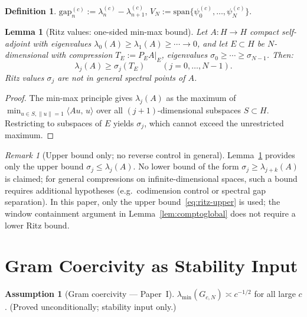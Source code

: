 \documentclass[12pt,a4paper]{amsart}
\newtheorem{lemma}[theorem]{Lemma}
\theoremstyle{definition}
\newtheorem{definition}[theorem]{Definition}
\newtheorem{assumption}[theorem]{Assumption}
\theoremstyle{remark}
\newtheorem{remark}[theorem]{Remark}
\newcommand{\ip}[2]{\langle #1,\, #2\rangle}
\newcommand{\lam}[2]{\lambda_{#2}^{(#1)}}
\newcommand{\gap}[2]{\mathrm{gap}_{#2}^{(#1)}}
\newcommand{\pswf}[1]{\psi_{#1}^{(c)}}
\newcommand{\spann}{\mathrm{span}}
\begin{document}
\begin{definition}
$\gap{c}{n} := \lam{c}{n} - \lam{c}{n+1}$,\quad
$V_N := \spann\{\pswf{0},\ldots,\pswf{N}\}$.
\end{definition}

\begin{lemma}[Ritz values: one-sided min-max bound]
\label{lem:compression}
Let $A: H \to H$ compact self-adjoint with eigenvalues
$\lambda_0(A) \geq \lambda_1(A) \geq \cdots \to 0$,
and let $E \subset H$ be $N$-dimensional with compression
$T_E := P_E A|_E$, eigenvalues $\sigma_0 \geq \cdots \geq \sigma_{N-1}$.
Then:
\begin{equation}\label{eq:ritz-upper}
  \lambda_j(A) \geq \sigma_j(T_E) \qquad (j = 0,\ldots,N-1).
\end{equation}
Ritz values $\sigma_j$ are not in general spectral points of $A$.
\end{lemma}

\begin{proof}
The min-max principle gives $\lambda_j(A)$ as the maximum of
$\min_{u \in S,\|u\|=1}\ip{Au}{u}$ over all $(j{+}1)$-dimensional
subspaces $S \subset H$. Restricting to subspaces of $E$ yields
$\sigma_j$, which cannot exceed the unrestricted maximum.
\end{proof}

\begin{remark}[Upper bound only; no reverse control in general]
\label{rem:upper-only}
Lemma~\ref{lem:compression} provides only the upper bound
$\sigma_j \leq \lambda_j(A)$.
No lower bound of the form $\sigma_j \geq \lambda_{j+k}(A)$ is claimed;
for general compressions on infinite-dimensional spaces, such a bound
requires additional hypotheses (e.g.\ codimension control or
spectral gap separation).
In this paper, only the upper bound~\eqref{eq:ritz-upper} is used;
the window containment argument in Lemma~\ref{lem:comptoglobal}
does not require a lower Ritz bound.
\end{remark}

\section{Gram Coercivity as Stability Input}
\label{sec:gram}

\begin{assumption}[Gram coercivity --- Paper~I]
\label{ass:gram}
$\lambda_{\min}(G_{c,N}) \asymp c^{-1/2}$ for all large $c$.
(Proved unconditionally; stability input only.)
\end{assumption}
\end{document}
